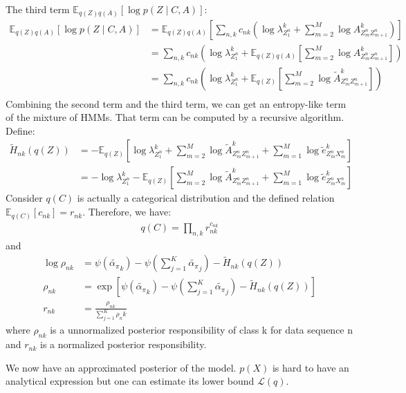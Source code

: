 \documentclass[12pt]{article}
\newenvironment{problem}[2][Problem]{\begin{trivlist}
\item[\hskip \labelsep {\bfseries #1}\hskip \labelsep {\bfseries #2.}]}{\end{trivlist}}
\begin{document}
\begin{problem}{2.8.24}
The third term $\mathbb{E}_{q(Z)q(A)}[\log p(Z \mid C, A)]$:
\begin{align*}
    \mathbb{E}_{q(Z)q(A)}[\log p(Z \mid C, A)]
    &= \mathbb{E}_{q(Z)q(A)}[
        \sum_{n,k}c_{nk}(\log\lambda^k_{Z^n_{1}} + \sum_{m=2}^{M}\log A^k_{Z^n_{m}Z^n_{m+1}})] \\
    &= \sum_{n,k}c_{nk}(\log\lambda^k_{Z^n_{1}} 
        + \mathbb{E}_{q(Z)q(A)}[\sum_{m=2}^{M}\log A^k_{Z^n_{m}Z^n_{m+1}}]) \\
    &= \sum_{n,k}c_{nk}(\log\lambda^k_{Z^n_{1}} 
        + \mathbb{E}_{q(Z)}[\sum_{m=2}^{M}\log \tilde{A}^k_{Z^n_{m}Z^n_{m+1}}]) \\
\end{align*}
Combining the second term and the third term, we can get an entropy-like term
of the mixture of HMMs. That term can be computed by a recursive algorithm.
Define:
\begin{align*}
    \tilde{H}_{nk}(q(Z)) &= -\mathbb{E}_{q(Z)}[
            \log\lambda^k_{Z^n_{1}} 
            + \sum_{m=2}^{M}\log \tilde{A}^k_{Z^n_{m}Z^n_{m+1}}
            + \sum_{m=1}^{M}\log \tilde{e}^k_{Z^n_m X^n_m}] \\
    &= - \log\lambda^k_{Z^n_{1}} -\mathbb{E}_{q(Z)}[            
            \sum_{m=2}^{M}\log \tilde{A}^k_{Z^n_{m}Z^n_{m+1}}
            + \sum_{m=1}^{M}\log \tilde{e}^k_{Z^n_m X^n_m}]
\end{align*}
Consider $q(C)$ is actually a categorical distribution and the defined relation
$\mathbb{E}_{q(C)}[c_{nk}] = r_{nk}$. Therefore, we have:
\begin{align*}
    q(C) = \prod_{n,k} r_{nk}^{c_{nk}}
\end{align*}
and 
\begin{align*}
    \log \rho_{nk} &= \psi(\tilde{\alpha_\pi}_k) - \psi(\sum_{j=1}^{K}\tilde{\alpha_\pi}_j)
                    - \tilde{H}_{nk}(q(Z)) \\
         \rho_{nk} &= \exp[\psi(\tilde{\alpha_\pi}_k) - \psi(\sum_{j=1}^{K}\tilde{\alpha_\pi}_j)
                        - \tilde{H}_{nk}(q(Z))] \\
         r_{nk} &= \frac{\rho_{nk}}{\sum_{j=1}^{K}\rho_nk}
\end{align*}
where $\rho_{nk}$ is a unnormalized posterior responsibility of class k for data sequence n and
$r_{nk}$ is a normalized posterior responsibility.

We now have an approximated posterior of the model. $p(X)$ is hard to have an analytical expression
but one can estimate its lower bound $\mathcal{L}(q)$.


\end{problem}
\end{document}
